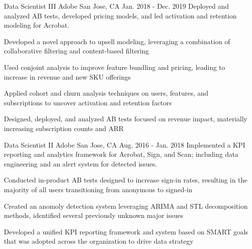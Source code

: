 \begin{cventries}
\cventry
    {Data Scientist III} %
    {Adobe} %
    {San Jose, CA} %
    {Jan. 2018 - Dec. 2019} %
    {Deployed and analyzed AB tests, developed pricing models, and led activation and retention modeling for Acrobat.} %
    {
      \begin{cvitems} %
        \item {Developed a novel approach to upsell modeling, leveraging a combination of collaborative filtering and content-based filtering}
        \item {Used conjoint analysis to improve feature bundling and pricing, leading to increase in revenue and new SKU offerings}
        \item {Applied cohort and churn analysis techniques on users, features, and subscriptions to uncover activation and retention factors}
        \item {Designed, deployed, and analyzed AB tests focused on revenue impact, materially increasing subscription counts and ARR}
      \end{cvitems}
    }

\cventry
    {Data Scientist II} %
    {Adobe} %
    {San Jose, CA} %
    {Aug. 2016 - Jan. 2018} %
    {Implemented a KPI reporting and analytics framework for Acrobat, Sign, and Scan; including data engineering and an alert system for detected issues.} %
    {
      \begin{cvitems} %
        \item {Conducted in-product AB tests designed to increase sign-in rates, resulting in the majority of all users transitioning from anonymous to signed-in}
        \item {Created an anomoly detection system leveraging ARIMA and STL decomposition methods, identified several previously unknown major issues}
        \item {Developed a unified KPI reporting framework and system based on SMART goals that was adopted across the organization to drive data strategy}
      \end{cvitems}
    }

\end{cventries}
